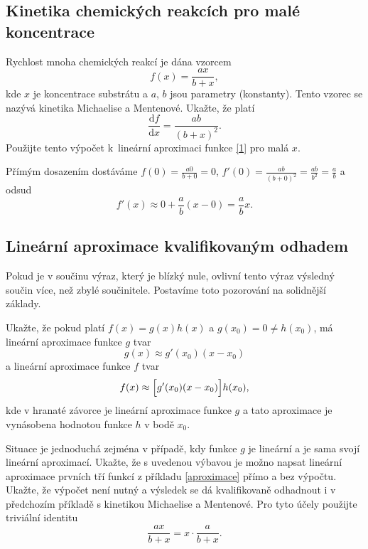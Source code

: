 \stranka

\subsection{Kinetika chemických reakcích pro malé koncentrace} Rychlost mnoha chemických reakcí je dána vzorcem
\begin{equation}\label{1}
  f(x)=\frac {ax}{b+x},
\end{equation}
kde $x$ je koncentrace substrátu a $a$, $b$ jsou parametry (konstanty). Tento vzorec se nazývá kinetika  Michaelise a Mentenové. Ukažte, že platí
\begin{equation*}
  \frac{\mathrm df}{\mathrm dx}=\frac{ab}{(b+x)^2}.
\end{equation*}
Použijte tento výpočet k lineární aproximaci funkce \eqref{1} pro malá $x$.%

\reseni

Přímým dosazením dostáváme $f(0)=\frac {a0}{b+0}=0$, $f'(0)=\frac{ab}{(b+0)^2}=\frac {ab}{b^2}=\frac ab$ a odsud
$$f'(x)\approx 0+\frac ab (x-0)=\frac ab x.$$
\konec

\stranka

\subsection{Lineární aproximace kvalifikovaným odhadem}

Pokud je v součinu výraz, který je blízký nule, ovlivní tento výraz výsledný součin více, než zbylé součinitele. Postavíme toto pozorování na solidnější základy.

Ukažte, že pokud platí $f(x)=g(x)h(x)$ a $g(x_0)=0\neq h(x_0)$, má lineární aproximace funkce $g$ tvar
$$g(x)\approx g'(x_0)(x-x_0)$$ a lineární aproximace funkce $f$ tvar
$$f(x)\approx \Bigl[g'(x_0) (x-x_0)\Bigr]h(x_0),$$
kde v hranaté závorce je lineární aproximace funkce $g$ a tato aproximace je vynásobena hodnotou funkce $h$ v bodě $x_0$.

Situace je jednoduchá zejména v případě, kdy funkce $g$ je lineární a
je sama svojí lineární aproximací. Ukažte, že s uvedenou výbavou je možno
napsat lineární aproximace prvních tří funkcí z příkladu
\ref{aproximace} přímo a bez výpočtu. Ukažte, že výpočet není nutný a výsledek se dá kvalifikovaně odhadnout i v
předchozím příkladě s kinetikou Michaelise a Mentenové. Pro tyto účely použijte triviální identitu
\begin{equation*}
  \frac {ax}{b+x}=x\cdot\frac {a}{b+x}.
\end{equation*}

